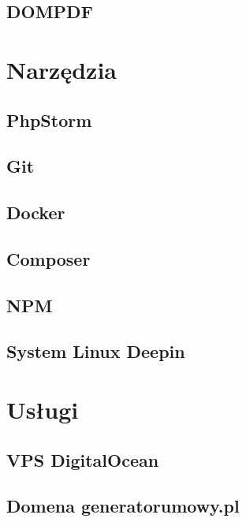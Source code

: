\documentclass[12pt]{report}
\begin{document}
            \subsection{DOMPDF}
                
        \section{Narzędzia}
            \subsection{PhpStorm}
                
            \subsection{Git}
                
            \subsection{Docker}
                
            \subsection{Composer}
                
            \subsection{NPM}
                
            \subsection{System Linux Deepin}
                
        \section{Usługi}
            \subsection{VPS DigitalOcean}
                
            \subsection{Domena generatorumowy.pl}
                
\end{document}
